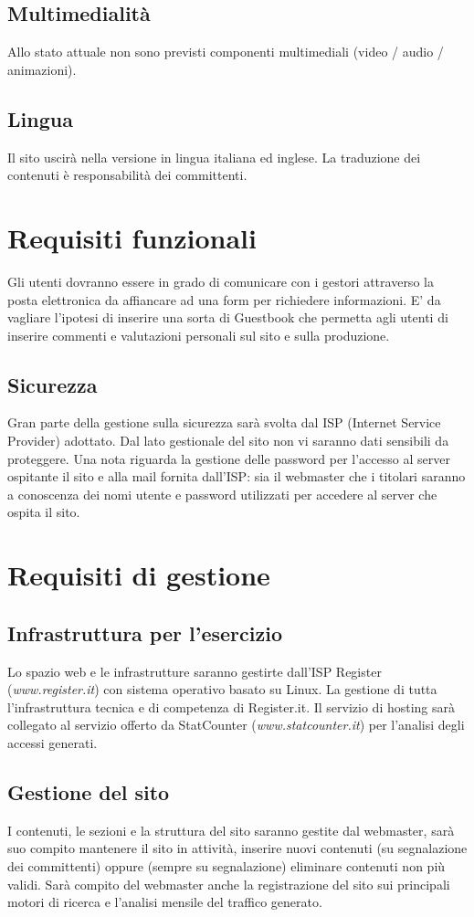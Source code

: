 \documentclass[a4paper]{report}	%
\begin{document}
\subsection{Multimedialità}
Allo stato attuale non sono previsti componenti multimediali (video / audio / animazioni).
\subsection{Lingua}
Il sito uscirà nella versione in lingua italiana ed inglese. La traduzione dei contenuti è responsabilità dei committenti.

\section{Requisiti funzionali}
Gli utenti dovranno essere in grado di comunicare con i gestori attraverso la posta elettronica da affiancare ad una form per richiedere informazioni. E' da vagliare l'ipotesi di inserire una sorta di Guestbook che permetta agli utenti di inserire commenti e valutazioni personali sul sito e sulla produzione.
\subsection{Sicurezza}
Gran parte della gestione sulla sicurezza sarà svolta dal ISP (Internet Service Provider) adottato. Dal lato gestionale del sito non vi saranno dati sensibili da proteggere. Una nota riguarda la gestione delle password per l'accesso al server ospitante il sito e alla mail fornita dall'ISP: sia il webmaster che i titolari saranno a conoscenza dei nomi utente e password utilizzati per accedere al server che ospita il sito. 

\section{Requisiti di gestione}
\subsection{Infrastruttura per l'esercizio}
Lo spazio web e le infrastrutture saranno gestirte dall'ISP Register (\textit{www.register.it}) con sistema operativo basato su Linux. La gestione di tutta l'infrastruttura tecnica e di competenza di Register.it. Il servizio di hosting sarà collegato al servizio offerto da StatCounter (\textit{www.statcounter.it}) per l'analisi degli accessi generati.
\subsection{Gestione del sito}
I contenuti, le sezioni e la struttura del sito saranno gestite dal webmaster, sarà suo compito mantenere il sito in attività, inserire nuovi contenuti (su segnalazione dei committenti) oppure (sempre su segnalazione) eliminare contenuti non più validi. Sarà compito del webmaster anche la registrazione del sito sui principali motori di ricerca e l'analisi mensile del traffico generato.
\end{document}
